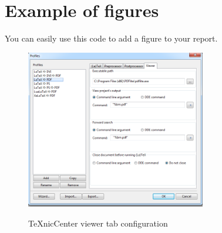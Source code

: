 \documentclass[paper=letter, fontsize=11pt]{scrartcl} %
\numberwithin{equation}{section} %
\numberwithin{figure}{section} %
\numberwithin{table}{section} %
\begin{document}
\section{Example of figures}

You can easily use this code to add a figure to your report.
\begin{figure}[ht]
	\caption{TeXnicCenter viewer tab configuration}
	\centering
			\includegraphics[width=0.7\textwidth]{figs/pdfliteviewer.png} %
	\label{fig:pdflite_viewer_config} %
\end{figure}

\end{document}
